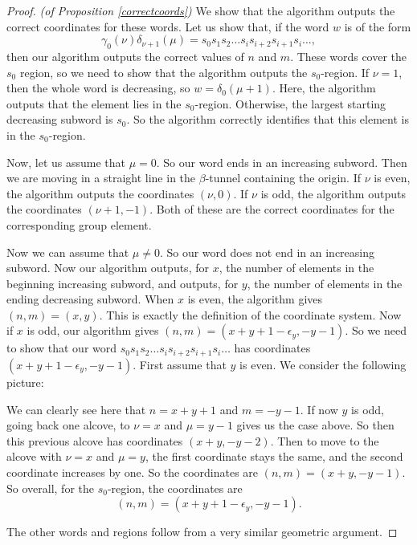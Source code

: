 \documentclass[11pt]{article}
\begin{document}
\begin{proof}\textit{(of Proposition \ref{correctcoords})}
    We show that the algorithm outputs the correct coordinates for these words. Let us show that, if the word $w$ is of the form 
    \[\gamma_0(\nu)\delta_{\nu+1}(\mu)=s_0s_1s_2\hdots s_is_{i+2}s_{i+1}s_i\hdots,\]
    then our algorithm outputs the correct values of $n$ and $m$. These words cover the $s_0$ region, so we need to show that the algorithm outputs the $s_0$-region. If $\nu=1$, then the whole word is decreasing, so $w=\delta_0(\mu+1)$. Here, the algorithm outputs that the element lies in the $s_0$-region. Otherwise, the largest starting decreasing subword is $s_0$. So the algorithm correctly identifies that this element is in the $s_0$-region. 
    
    Now, let us assume that $\mu=0$. So our word ends in an increasing subword. Then we are moving in a straight line in the $\beta$-tunnel containing the origin. If $\nu$ is even, the algorithm outputs the coordinates $(\nu,0)$. If $\nu$ is odd, the algorithm outputs the coordinates $(\nu+1,-1)$. Both of these are the correct coordinates for the corresponding group element. 
    
    Now we can assume that $\mu\neq 0$. So our word does not end in an increasing subword. Now our algorithm outputs, for $x$, the number of elements in the beginning increasing subword, and outputs, for $y$, the number of elements in the ending decreasing subword. When $x$ is even, the algorithm gives $(n,m)=(x,y)$. This is exactly the definition of the coordinate system.
Now if $x$ is odd, our algorithm gives $(n,m)=(x+y+1-\epsilon_y,-y-1)$. So we need to show that our word $s_0s_1s_2\hdots s_is_{i+2}s_{i+1}s_i\hdots$ has coordinates $(x+y+1-\epsilon_y,-y-1)$. First assume that $y$ is even. We consider the following picture:
\begin{center}
\resizebox{0.5\textwidth}{!}{}

\end{center}


We can clearly see here that $n=x+y+1$ and $m=-y-1$. If now $y$ is odd, going back one alcove, to $\nu=x$ and $\mu=y-1$ gives us the case above. So then this previous alcove has coordinates $(x+y,-y-2)$. Then to move to the alcove with $\nu=x$ and $\mu=y$, the first coordinate stays the same, and the second coordinate increases by one. So the coordinates are $(n,m)=(x+y,-y-1)$. So overall, for the $s_0$-region, the coordinates are
\[(n,m)=(x+y+1-\epsilon_y,-y-1).\]

The other words and regions follow from a very similar geometric argument.
\end{proof}
\end{document}
